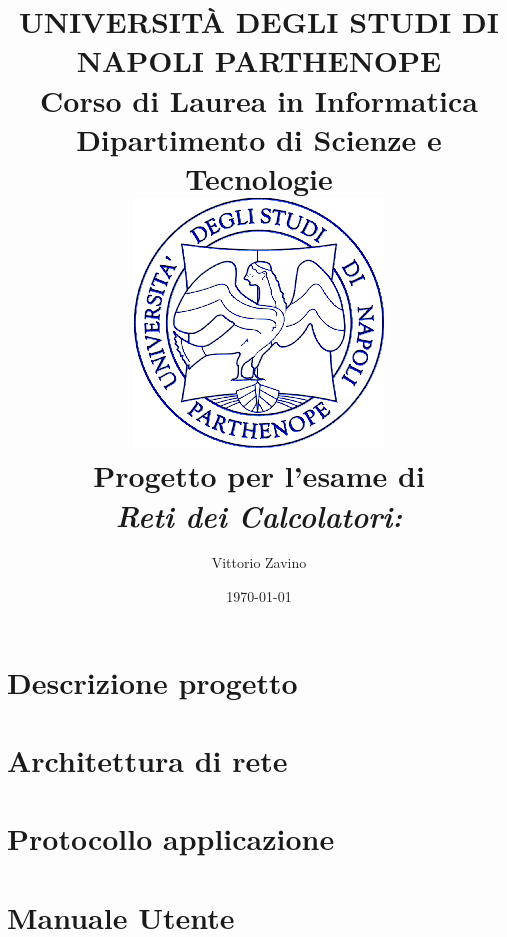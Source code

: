 \documentclass[12pt]{report}
\title{
    \Large{{UNIVERSITÀ DEGLI STUDI DI NAPOLI PARTHENOPE}}\\
    {Corso di Laurea in Informatica}\\
    {Dipartimento di Scienze e Tecnologie}\\
    \vspace{0.5cm}
    \includegraphics[scale=0.70]{Parthenope_logo.png}\\
	{\textbf{Progetto per l'esame di \\ \textit{Reti dei Calcolatori:}}}\\
    {\textbf{\vitcoin}}
}
\author{Vittorio Zavino}
\date{\today}
\begin{document}
\maketitle

\tableofcontents
\listoffigures

\chapter{Descrizione progetto}


\chapter{Architettura di rete}


\chapter{Protocollo applicazione}


\chapter{Manuale Utente}

\end{document}
